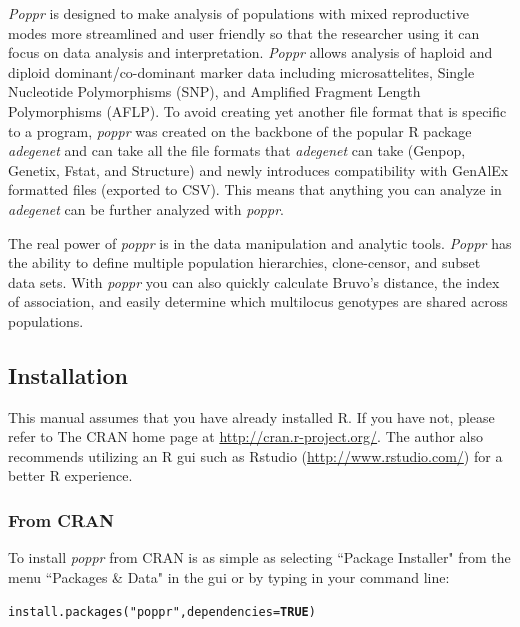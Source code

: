 \documentclass[letterpaper]{article}\usepackage[]{graphicx}\usepackage[]{color}
\makeatletter
\newcommand{\hlnum}[1]{\textcolor[rgb]{0.502,0,0.502}{\textbf{#1}}}%
\newcommand{\hlstr}[1]{\textcolor[rgb]{0.651,0.522,0}{#1}}%
\newcommand{\hlstd}[1]{\textcolor[rgb]{0,0,0}{#1}}%
\newcommand{\hlkwc}[1]{\textcolor[rgb]{0,0.502,0.753}{#1}}%
\newcommand{\hlkwd}[1]{\textcolor[rgb]{0,0.267,0.4}{#1}}%
\newenvironment{kframe}{%
 \def\at@end@of@kframe{}%
 \ifinner\ifhmode%
  \def\at@end@of@kframe{\end{minipage}}%
  \begin{minipage}{\columnwidth}%
 \fi\fi%
 \def\FrameCommand##1{\hskip\@totalleftmargin \hskip-\fboxsep
 \colorbox{shadecolor}{##1}\hskip-\fboxsep
     \hskip-\linewidth \hskip-\@totalleftmargin \hskip\columnwidth}%
 \MakeFramed {\advance\hsize-\width
   \@totalleftmargin\z@ \linewidth\hsize
   \@setminipage}}%
 {\par\unskip\endMakeFramed%
 \at@end@of@kframe}
\newenvironment{knitrout}{}{} %
\newcommand{\tab}{\hspace*{1em}}
\newcommand{\poppr}{\textit{poppr}}
\newcommand{\Poppr}{\textit{Poppr}}
\newcommand{\adegenet}{\textit{adegenet}}
\makeatother
\begin{document}
\Poppr{} is designed to make analysis of populations with mixed reproductive modes more streamlined and user friendly so that the researcher using it can focus on data analysis and interpretation. \Poppr{} allows analysis of haploid and diploid dominant/co-dominant marker data including microsattelites, Single Nucleotide Polymorphisms (SNP), and Amplified Fragment Length Polymorphisms (AFLP). To avoid creating yet another file format that is specific to a program, \poppr{} was created on the backbone of the popular R package \adegenet{} and can take all the file formats that \adegenet{} can take (Genpop, Genetix, Fstat, and Structure) and newly introduces compatibility with GenAlEx formatted files (exported to CSV). This means that anything you can analyze in \adegenet{} can be further analyzed with \poppr{}.

The real power of \poppr{} is in the data manipulation and analytic tools. \Poppr{} has the ability to define multiple population hierarchies, clone-censor, and subset data sets. With \poppr{} you can also quickly calculate Bruvo's distance, the index of association, and easily determine which multilocus genotypes are shared across populations.
%
\subsection{Installation}
\label{intro:install}

\tab\tab This manual assumes that you have already installed R. If you have not, please refer to The CRAN home page at \url{http://cran.r-project.org/}. The author also recommends utilizing an R gui such as Rstudio (\url{http://www.rstudio.com/}) for a better R experience. 

\subsubsection{From CRAN}
\tab\tab To install \poppr{} from CRAN is as simple as selecting ``Package Installer" from the menu ``Packages \& Data" in the gui or by typing in your command line:
\begin{knitrout}\footnotesize
{}\color{fgcolor}\begin{kframe}
\begin{alltt}
\hlkwd{install.packages}\hlstd{(}\hlstr{"poppr"}\hlstd{,} \hlkwc{dependencies} \hlstd{=} \hlnum{TRUE}\hlstd{)}
\end{alltt}
\end{kframe}
\end{knitrout}
\end{document}
